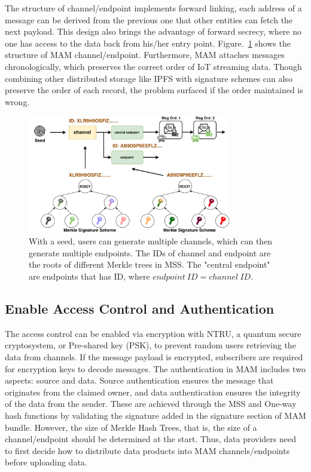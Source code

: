 \documentclass[conference]{IEEEtran}
\begin{document}
The structure of channel/endpoint implements forward linking, each address of a message can be derived from the previous one that other entities can fetch the next payload. This design also brings the advantage of forward secrecy, where no one has access to the data back from his/her entry point. Figure.~\ref{fig:mam_structure} shows the structure of MAM channel/endpoint. Furthermore, MAM attaches messages chronologically, which preserves the correct order of IoT streaming data. Though combining other distributed storage like IPFS with signature schemes can also preserve the order of each record, the problem surfaced if the order maintained is wrong.

\begin{figure}[h]
    \centering
    \includegraphics[width=3.5in]{mam_structure}
    \caption{With a seed, users can generate multiple channels, which can then generate multiple endpoints. The IDs of channel and endpoint are the roots of different Merkle trees in MSS. The "central endpoint" are endpoints that has ID, where $endpoint\ ID = channel\ ID$.}
    \label{fig:mam_structure}
\end{figure}

\subsection{Enable Access Control and Authentication}
The access control can be enabled via encryption with NTRU\cite{NTRU}, a quantum secure cryptosystem, or Pre-shared key (PSK), to prevent random users retrieving the data from channels. If the message payload is encrypted, subscribers are required for encryption keys to decode messages. The authentication in MAM includes two aspects: source and data. Source authentication ensures the message that originates from the claimed owner, and data authentication ensures the integrity of the data from the sender. These are achieved through the MSS and One-way hash functions by validating the signature added in the signature section of MAM bundle. However, the size of Merkle Hash Trees, that is, the size of a channel/endpoint should be determined at the start. Thus, data providers need to first decide how to distribute data products into MAM channels/endpoints before uploading data. 
\end{document}
